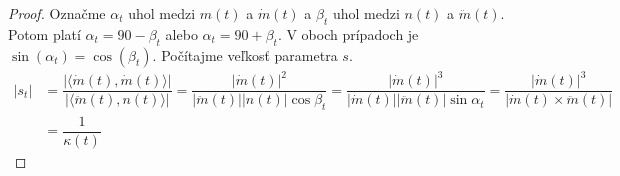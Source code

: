 \begin{proof}
Označme $\alpha_t $ uhol medzi $m(t)$ a $\dot{m}(t)$ a $\beta_t $ uhol medzi $n(t)$ a $\ddot{m}(t)$. Potom platí $\alpha_t = 90 - \beta_t$ alebo $\alpha_t = 90 + \beta_t$. V oboch prípadoch je $\sin (\alpha_t) = \cos (\beta_t).$ Počítajme veľkosť parametra $s.$
\begin{align*}
|s_t| &= \dfrac{| \langle \dot{m}(t), \dot{m}(t) \rangle |}{ |\langle \ddot{m}(t), n(t) \rangle |} = \dfrac{| \dot{m}(t) |^2}{| \ddot{m}(t) | | n(t) | \cos \beta_t } = \dfrac{| \dot{m}(t) |^3}{| \dot{m}(t) | | \ddot{m}(t) | \sin \alpha_t } = \dfrac{| \dot{m}(t) |^3}{ | \dot{m}(t) \times \ddot{m}(t) | } \\
&= \dfrac{1}{\kappa (t)}
\end{align*} 
\end{proof}




